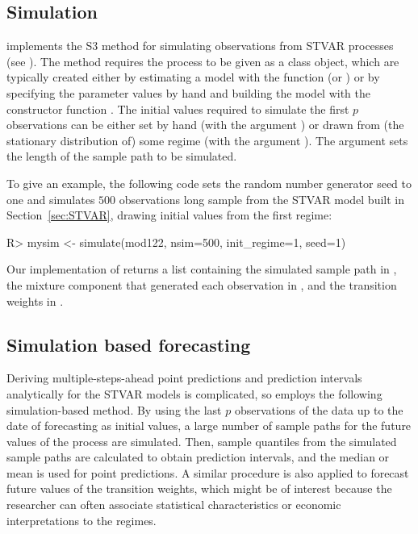 \documentclass[nojss]{jss}
\begin{document}
\subsection{Simulation}\label{sec:simu}
 implements the S3 method  for simulating observations from STVAR processes (see ). The method requires the process to be given as a class  object, which are typically created either by estimating a model with the function  (or ) or by specifying the parameter values by hand and building the model with the constructor function . The initial values required to simulate the first $p$ observations can be either set by hand (with the argument ) or drawn from (the stationary distribution of) some regime (with the argument ). The argument  sets the length of the sample path to be simulated.

To give an example, the following code sets the random number generator seed to one and simulates $500$ observations long sample from the STVAR model built in Section~\ref{sec:STVAR}, drawing initial values from the first regime:
%
\begin{CodeChunk}
\begin{CodeInput}
R> mysim <- simulate(mod122, nsim=500, init_regime=1, seed=1)
\end{CodeInput}
\end{CodeChunk}
%
Our implementation of  returns a list containing the simulated sample path in , the mixture component that generated each observation in , and the transition weights in .

\subsection{Simulation based forecasting}
Deriving multiple-steps-ahead point predictions and prediction intervals analytically for the STVAR models is complicated, so  employs the following simulation-based method. By using the last $p$ observations of the data up to the date of forecasting as initial values, a large number of sample paths for the future values of the process are simulated. Then, sample quantiles from the simulated sample paths are calculated to obtain prediction intervals, and the median or mean is used for point predictions. A similar procedure is also applied to forecast future values of the transition weights, which might be of interest because the researcher can often associate statistical characteristics or economic interpretations to the regimes.
\end{document}
